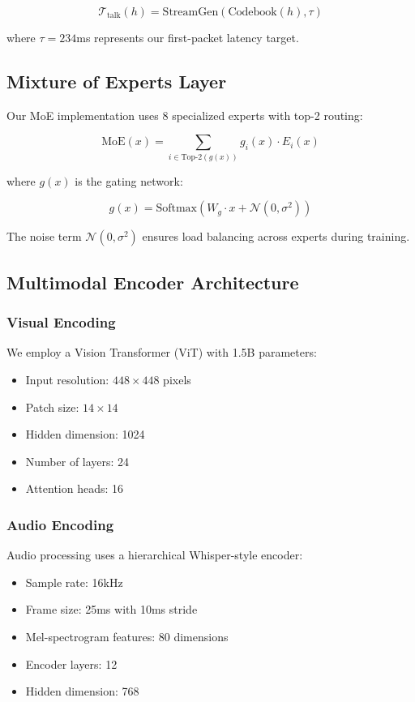 \begin{equation}
\mathcal{T}_{\text{talk}}(h) = \text{StreamGen}(\text{Codebook}(h), \tau)
\end{equation}

where $\tau = 234$ms represents our first-packet latency target.

\subsection{Mixture of Experts Layer}

Our MoE implementation uses 8 specialized experts with top-2 routing:

\begin{equation}
\text{MoE}(x) = \sum_{i \in \text{Top-2}(g(x))} g_i(x) \cdot E_i(x)
\end{equation}

where $g(x)$ is the gating network:

\begin{equation}
g(x) = \text{Softmax}(W_g \cdot x + \mathcal{N}(0, \sigma^2))
\end{equation}

The noise term $\mathcal{N}(0, \sigma^2)$ ensures load balancing across experts during training.

\subsection{Multimodal Encoder Architecture}

\subsubsection{Visual Encoding}
We employ a Vision Transformer (ViT) with 1.5B parameters:
\begin{itemize}
    \item Input resolution: $448 \times 448$ pixels
    \item Patch size: $14 \times 14$
    \item Hidden dimension: 1024
    \item Number of layers: 24
    \item Attention heads: 16
\end{itemize}

\subsubsection{Audio Encoding}
Audio processing uses a hierarchical Whisper-style encoder:
\begin{itemize}
    \item Sample rate: 16kHz
    \item Frame size: 25ms with 10ms stride
    \item Mel-spectrogram features: 80 dimensions
    \item Encoder layers: 12
    \item Hidden dimension: 768
\end{itemize}

